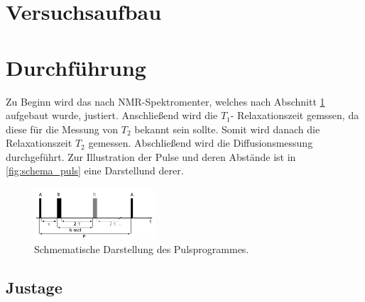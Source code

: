 \section{Versuchsaufbau} \label{sec:Aufbau}

\section{Durchführung}

    \noindent Zu Beginn wird das nach NMR-Spektromenter, welches nach Abschnitt \ref{sec:Aufbau} aufgebaut wurde, justiert. Anschließend wird die $T_1$- Relaxationszeit gemssen, da diese für die Messung von $T_2$ bekannt 
    sein sollte. Somit wird danach die Relaxationszeit $T_2$ gemessen.  Abschließend wird die Diffusionsmessung durchgeführt. Zur Illustration der Pulse und deren Abstände ist in \autoref{fig:schema_puls} eine Darstellund 
    derer. 

    \begin{figure}
        \centering
        \includegraphics[width=0.4\textwidth]{images/schema_puls.png}
        \caption{Schmematische Darstellung des Pulsprogrammes. \cite{V49}}
        \label{fig:schema_puls}
    \end{figure}

    \subsection{Justage}

